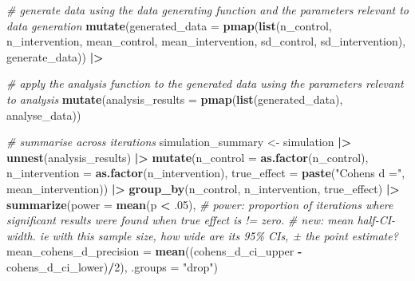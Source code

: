 \documentclass[
]{article}
\newenvironment{Shaded}{\begin{snugshade}}{\end{snugshade}}
\newcommand{\AttributeTok}[1]{\textcolor[rgb]{0.13,0.29,0.53}{#1}}
\newcommand{\CommentTok}[1]{\textcolor[rgb]{0.56,0.35,0.01}{\textit{#1}}}
\newcommand{\DecValTok}[1]{\textcolor[rgb]{0.00,0.00,0.81}{#1}}
\newcommand{\FunctionTok}[1]{\textcolor[rgb]{0.13,0.29,0.53}{\textbf{#1}}}
\newcommand{\NormalTok}[1]{#1}
\newcommand{\OtherTok}[1]{\textcolor[rgb]{0.56,0.35,0.01}{#1}}
\newcommand{\SpecialCharTok}[1]{\textcolor[rgb]{0.81,0.36,0.00}{\textbf{#1}}}
\newcommand{\StringTok}[1]{\textcolor[rgb]{0.31,0.60,0.02}{#1}}
\begin{document}
\begin{Shaded}
\begin{Highlighting}[]
  \CommentTok{\# generate data using the data generating function and the parameters relevant to data generation}
  \FunctionTok{mutate}\NormalTok{(}\AttributeTok{generated\_data =} \FunctionTok{pmap}\NormalTok{(}\FunctionTok{list}\NormalTok{(n\_control,}
\NormalTok{                                    n\_intervention,}
\NormalTok{                                    mean\_control,}
\NormalTok{                                    mean\_intervention,}
\NormalTok{                                    sd\_control,}
\NormalTok{                                    sd\_intervention),}
\NormalTok{                               generate\_data)) }\SpecialCharTok{|\textgreater{}}
  
  \CommentTok{\# apply the analysis function to the generated data using the parameters relevant to analysis}
  \FunctionTok{mutate}\NormalTok{(}\AttributeTok{analysis\_results =} \FunctionTok{pmap}\NormalTok{(}\FunctionTok{list}\NormalTok{(generated\_data),}
\NormalTok{                                 analyse\_data))}
  

\CommentTok{\# summarise across iterations }
\NormalTok{simulation\_summary }\OtherTok{\textless{}{-}}\NormalTok{ simulation }\SpecialCharTok{|\textgreater{}}
  \FunctionTok{unnest}\NormalTok{(analysis\_results) }\SpecialCharTok{|\textgreater{}}
  \FunctionTok{mutate}\NormalTok{(}\AttributeTok{n\_control =} \FunctionTok{as.factor}\NormalTok{(n\_control),}
         \AttributeTok{n\_intervention =} \FunctionTok{as.factor}\NormalTok{(n\_intervention),}
         \AttributeTok{true\_effect =} \FunctionTok{paste}\NormalTok{(}\StringTok{"Cohen\textquotesingle{}s d ="}\NormalTok{, mean\_intervention)) }\SpecialCharTok{|\textgreater{}}
  \FunctionTok{group\_by}\NormalTok{(n\_control,}
\NormalTok{           n\_intervention,}
\NormalTok{           true\_effect) }\SpecialCharTok{|\textgreater{}}
  \FunctionTok{summarize}\NormalTok{(}\AttributeTok{power =} \FunctionTok{mean}\NormalTok{(p }\SpecialCharTok{\textless{}}\NormalTok{ .}\DecValTok{05}\NormalTok{), }\CommentTok{\# power: proportion of iterations where significant results were found when true effect is != zero.}
            \CommentTok{\# new: mean half{-}CI{-}width. ie with this sample size, how wide are its 95\% CIs, ± the point estimate?}
            \AttributeTok{mean\_cohens\_d\_precision =} \FunctionTok{mean}\NormalTok{((cohens\_d\_ci\_upper }\SpecialCharTok{{-}}\NormalTok{ cohens\_d\_ci\_lower)}\SpecialCharTok{/}\DecValTok{2}\NormalTok{), }
            \AttributeTok{.groups =} \StringTok{"drop"}\NormalTok{)}


\end{Highlighting}
\end{Shaded}
\end{document}
